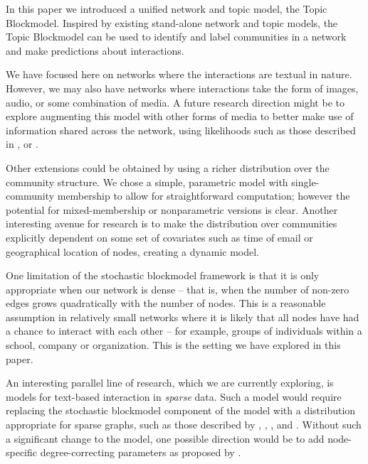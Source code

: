    In this paper we introduced a unified network and topic model, the Topic Blockmodel. Inspired by existing stand-alone network and topic models, the Topic Blockmodel can be used to identify and label communities in a network and make predictions about interactions. %
    
    We have focused here on networks where the interactions are textual in nature. However, we may also have networks where interactions take the form of images, audio, or some combination of media. A future research direction might be to explore augmenting this model with other forms of media to better make use of information shared across the network, using likelihoods such as those described in \citep{cao2007spatially}, \citep{niu2012context} or \citep{kim2009acoustic}.
    
    Other extensions could be obtained by using a richer distribution over the community structure. We chose a simple, parametric model with single-community membership to allow for straightforward computation; however the potential for mixed-membership or nonparametric versions is clear. Another interesting avenue for research is to make the distribution over communities explicitly dependent on some set of covariates such as time of email or geographical location of nodes, creating a dynamic model.

    One limitation of the stochastic blockmodel framework is that it is only appropriate when our network is dense -- that is, when the number of non-zero edges grows quadratically with the number of nodes. This is a reasonable assumption in relatively small networks where it is likely that all nodes have had a chance to interact with each other -- for example, groups of individuals within a school, company or organization. This is the setting we have explored in this paper.
    
    An interesting parallel line of research, which we are currently exploring, is models for text-based interaction in \textit{sparse} data. Such a model would require replacing the stochastic blockmodel component of the model with a distribution appropriate for sparse graphs, such as those described by \citep{Caron:Fox:2014}, \citep{Veitch:Roy:2015}, \citep{Cai:Campbell:Broderick:2016}, \citep{Crane:Dempsey:2016} and \citep{williamson2016nonparametric}. Without such a significant change to the model, one possible direction would be to add node-specific degree-correcting parameters as proposed by \citep{Karrer:Newman:2011}.

